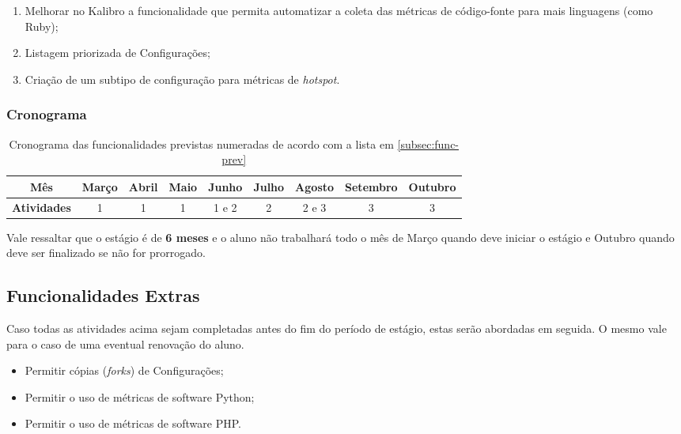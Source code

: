 \documentclass[12pt]{article}
\begin{document}
      \begin{enumerate}
        \item Melhorar no Kalibro a funcionalidade que permita automatizar a coleta das métricas de código-fonte para mais linguagens (como Ruby);
        \item Listagem priorizada de Configurações;
        \item Criação de um subtipo de configuração para métricas de \textit{hotspot}.
      \end{enumerate}

      \subsubsection{Cronograma}
        \begin{table}[H]
          \begin{tabu}{| c | c | c | c | c | c | c | c | c |}
            \hline
            \textbf{Mês} & Março & Abril & Maio & Junho & Julho & Agosto & Setembro & Outubro \\ \hline
            \textbf{Atividades} & 1 & 1 & 1 & 1 e 2 & 2 & 2 e 3 & 3 & 3 \\ \hline
          \end{tabu}
          \caption{Cronograma das funcionalidades previstas numeradas de acordo com a lista em \ref{subsec:func-prev}}
        \end{table}

        Vale ressaltar que o estágio é de \textbf{6 meses} e o aluno não trabalhará todo o mês de Março quando deve iniciar o estágio e Outubro quando deve ser finalizado se não for prorrogado.

    \subsection{Funcionalidades Extras}
      Caso todas as atividades acima sejam completadas antes do fim do período de estágio, estas serão abordadas em seguida. O mesmo vale para o caso de uma eventual renovação do aluno.

      \begin{itemize}
        \item Permitir cópias (\textit{forks}) de Configurações;
        \item Permitir o uso de métricas de software Python;
        \item Permitir o uso de métricas de software PHP.
      \end{itemize}
\end{document}

